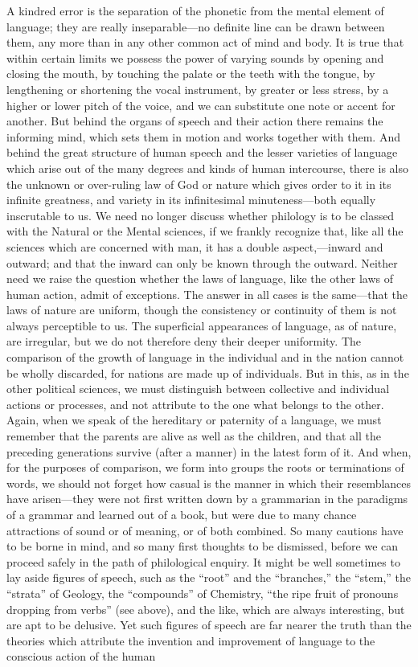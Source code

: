 \documentclass[11pt,letter]{article}
\begin{document}
\par  A kindred error is the separation of the phonetic from the mental element of language; they are really inseparable—no definite line can be drawn between them, any more than in any other common act of mind and body. It is true that within certain limits we possess the power of varying sounds by opening and closing the mouth, by touching the palate or the teeth with the tongue, by lengthening or shortening the vocal instrument, by greater or less stress, by a higher or lower pitch of the voice, and we can substitute one note or accent for another. But behind the organs of speech and their action there remains the informing mind, which sets them in motion and works together with them. And behind the great structure of human speech and the lesser varieties of language which arise out of the many degrees and kinds of human intercourse, there is also the unknown or over-ruling law of God or nature which gives order to it in its infinite greatness, and variety in its infinitesimal minuteness—both equally inscrutable to us. We need no longer discuss whether philology is to be classed with the Natural or the Mental sciences, if we frankly recognize that, like all the sciences which are concerned with man, it has a double aspect,—inward and outward; and that the inward can only be known through the outward. Neither need we raise the question whether the laws of language, like the other laws of human action, admit of exceptions. The answer in all cases is the same—that the laws of nature are uniform, though the consistency or continuity of them is not always perceptible to us. The superficial appearances of language, as of nature, are irregular, but we do not therefore deny their deeper uniformity. The comparison of the growth of language in the individual and in the nation cannot be wholly discarded, for nations are made up of individuals. But in this, as in the other political sciences, we must distinguish between collective and individual actions or processes, and not attribute to the one what belongs to the other. Again, when we speak of the hereditary or paternity of a language, we must remember that the parents are alive as well as the children, and that all the preceding generations survive (after a manner) in the latest form of it. And when, for the purposes of comparison, we form into groups the roots or terminations of words, we should not forget how casual is the manner in which their resemblances have arisen—they were not first written down by a grammarian in the paradigms of a grammar and learned out of a book, but were due to many chance attractions of sound or of meaning, or of both combined. So many cautions have to be borne in mind, and so many first thoughts to be dismissed, before we can proceed safely in the path of philological enquiry. It might be well sometimes to lay aside figures of speech, such as the “root” and the “branches,” the “stem,” the “strata” of Geology, the “compounds” of Chemistry, “the ripe fruit of pronouns dropping from verbs” (see above), and the like, which are always interesting, but are apt to be delusive. Yet such figures of speech are far nearer the truth than the theories which attribute the invention and improvement of language to the conscious action of the human 
\end{document}
